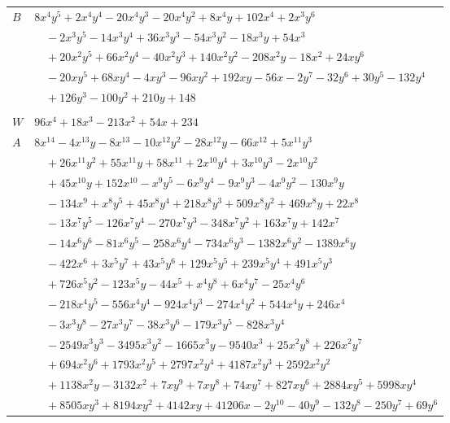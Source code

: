 \documentclass[11pt]{article}
\begin{document}
\begin{longtable}{@{}ll@{}}
$B$ & $8x^{4}y^{5}+2x^{4}y^{4}-20x^{4}y^{3}-20x^{4}y^{2}+8x^{4}y+102x^{4}+2x^{3}y^{6}$\\
 & $\quad -2x^{3}y^{5}-14x^{3}y^{4}+36x^{3}y^{3}-54x^{3}y^{2}-18x^{3}y+54x^{3}$\\
 & $\quad +20x^{2}y^{5}+66x^{2}y^{4}-40x^{2}y^{3}+140x^{2}y^{2}-208x^{2}y-18x^{2}+24xy^{6}$\\
 & $\quad -20xy^{5}+68xy^{4}-4xy^{3}-96xy^{2}+192xy-56x-2y^{7}-32y^{6}+30y^{5}-132y^{4}$\\
 & $\quad +126y^{3}-100y^{2}+210y+148$\\
\addlinespace[3pt]
\multicolumn{2}{@{}l}{$g=2$, $i=8$, $m=1$, neighbours $6,13,15,17,18,23,25,27,30,34,37,42$}\\
$W$ & $96x^{4}+18x^{3}-213x^{2}+54x+234$\\
$A$ & $8x^{14}-4x^{13}y-8x^{13}-10x^{12}y^{2}-28x^{12}y-66x^{12}+5x^{11}y^{3}$\\
 & $\quad +26x^{11}y^{2}+55x^{11}y+58x^{11}+2x^{10}y^{4}+3x^{10}y^{3}-2x^{10}y^{2}$\\
 & $\quad +45x^{10}y+152x^{10}-x^{9}y^{5}-6x^{9}y^{4}-9x^{9}y^{3}-4x^{9}y^{2}-130x^{9}y$\\
 & $\quad -134x^{9}+x^{8}y^{5}+45x^{8}y^{4}+218x^{8}y^{3}+509x^{8}y^{2}+469x^{8}y+22x^{8}$\\
 & $\quad -13x^{7}y^{5}-126x^{7}y^{4}-270x^{7}y^{3}-348x^{7}y^{2}+163x^{7}y+142x^{7}$\\
 & $\quad -14x^{6}y^{6}-81x^{6}y^{5}-258x^{6}y^{4}-734x^{6}y^{3}-1382x^{6}y^{2}-1389x^{6}y$\\
 & $\quad -422x^{6}+3x^{5}y^{7}+43x^{5}y^{6}+129x^{5}y^{5}+239x^{5}y^{4}+491x^{5}y^{3}$\\
 & $\quad +726x^{5}y^{2}-123x^{5}y-44x^{5}+x^{4}y^{8}+6x^{4}y^{7}-25x^{4}y^{6}$\\
 & $\quad -218x^{4}y^{5}-556x^{4}y^{4}-924x^{4}y^{3}-274x^{4}y^{2}+544x^{4}y+246x^{4}$\\
 & $\quad -3x^{3}y^{8}-27x^{3}y^{7}-38x^{3}y^{6}-179x^{3}y^{5}-828x^{3}y^{4}$\\
 & $\quad -2549x^{3}y^{3}-3495x^{3}y^{2}-1665x^{3}y-9540x^{3}+25x^{2}y^{8}+226x^{2}y^{7}$\\
 & $\quad +694x^{2}y^{6}+1793x^{2}y^{5}+2797x^{2}y^{4}+4187x^{2}y^{3}+2592x^{2}y^{2}$\\
 & $\quad +1138x^{2}y-3132x^{2}+7xy^{9}+7xy^{8}+74xy^{7}+827xy^{6}+2884xy^{5}+5998xy^{4}$\\
 & $\quad +8505xy^{3}+8194xy^{2}+4142xy+41206x-2y^{10}-40y^{9}-132y^{8}-250y^{7}+69y^{6}$\\

\end{longtable}
\end{document}
